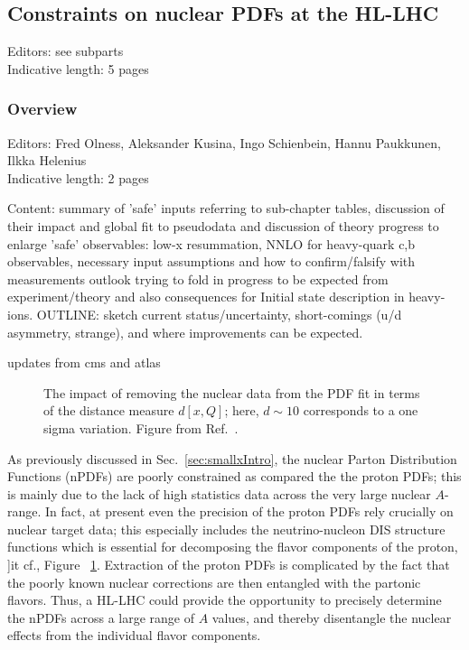 \documentclass[../report.tex]{subfiles}
\providecommand{\main}{..}
\begin{document}
\subsection{Constraints on nuclear PDFs at the HL-LHC}
\label{sec:nPDFs}
Editors: see subparts\\
Indicative length: 5 pages
\subsubsection{Overview}
Editors: Fred Olness, Aleksander Kusina, Ingo Schienbein, Hannu Paukkunen,   Ilkka Helenius\\
Indicative length: 2 pages 

\color{blue}
Content: summary of 'safe' inputs referring to sub-chapter tables, discussion of their impact and global fit to pseudodata and discussion of theory progress to enlarge 'safe' observables: low-x resummation, NNLO for heavy-quark c,b observables, necessary input assumptions and how to confirm/falsify with measurements
outlook trying to fold in progress to be expected from experiment/theory and also consequences for Initial state description in heavy-ions.  OUTLINE: sketch current status/uncertainty, short-comings (u/d asymmetry, strange),
and where improvements can be expected.

updates from cms\cite{Chatrchyan:2013uja} and atlas\cite{Aad:2014xca}

\color{black}

\begin{figure}[tbh] %
\centering{} 
\caption{
The impact of removing the nuclear data from the PDF fit  
in terms of the distance measure $d[x,Q]$;  here,  $d \sim 10$ corresponds to a one sigma variation. 
Figure from  Ref.~\cite{Ball:2017nwa}.
}
\label{fig:nnpdfDistance}
\end{figure}


As previously discussed in Sec.~\ref{sec:smallxIntro}, the nuclear Parton Distribution Functions (nPDFs) are poorly constrained as compared the the proton PDFs; this is mainly due to the lack of high statistics data across the very 
large nuclear $A$-range. 
%
In fact, at present even the precision of the proton PDFs  rely crucially on 
nuclear target data; this especially  includes the neutrino-nucleon DIS structure functions which is essential for decomposing the flavor components of the proton, {]it cf., } Figure ~\ref{fig:nnpdfDistance}.
Extraction of the proton PDFs is complicated by the fact that the poorly known nuclear corrections are then entangled with the partonic flavors. 
%
Thus, a HL-LHC could provide the opportunity to precisely determine 
the nPDFs across a large range of $A$ values, and thereby
disentangle the nuclear effects from the individual flavor components. 
\end{document}
